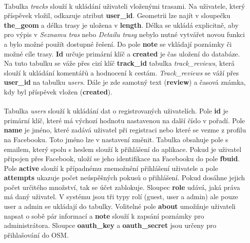 \documentclass[11pt,a4paper,titlepage,oneside]{book}
\begin{document}

			\paragraph{} Tabulka \textit{tracks} slouží k ukládání uživateli vloženými trasami. Na uživatele, který příspěvek vložil, odkazuje atribut \textbf{user\_id}. Geometrii lze najít v sloupečku \textbf{the\_geom} a délka trasy je uložena v \textbf{length}. Délka se ukládá explicitně, aby pro výpis v \textit{Seznamu tras} nebo \textit{Detailu trasy} nebylo nutné vytvářet novou funkci a bylo možné použít dostupné řešení.  Do pole \textbf{note} se vkládají poznámky či možné cíle trasy. \textbf{Id} určuje primární klíč a \textbf{created} je čas uložení do databáze. Na tuto tabulku se váže přes cizí klíč \textbf{track\_id} tabulka \textit{track\_reviews}, která slouží k ukládání komentářů a hodnocení k cestám. \textit{Track\_reviews} se váží přes \textbf{user\_id} na tabulku \textit{users}. Dále je zde samotný text (\textbf{review}) a časová známka, kdy byl příspěvek vložen (\textbf{created}).
			\paragraph{}\label{par:users}Tabulka \textit{users} slouží k ukládání dat o registrovaných uživatelích. Pole \textbf{id} je primární klíč, které má výchozí hodnotu nastavenou na další číslo v pořadí. Pole \textbf{name} je jméno, které zadává uživatel při registraci nebo které se vezme z profilu na Facebooku. Toto jméno lze v nastavení změnit. Tabulka obsahuje pole s emailem, který spolu s heslem slouží k přihlášení do aplikace. Pokud je uživatel připojen přes Facebook, uloží se jeho identifikace na Facebooku do pole \textbf{fbuid}. Pole \textbf{active} slouží k případnému znemožnění přihlášení uživatele a pole \textbf{attempts} ukazuje počet neúspěšných pokusů o přihlášení. Pokud dosáhne jejich počet určitého množství, tak se účet zablokuje. Sloupec \textbf{role} udává, jaká práva má daný uživatel. V systému jsou tři typy rolí (guest, user a admin) ale pouze user a admin se ukládají do tabulky. Volitelné pole \textbf{about} umožňuje uživateli napsat o sobě pár informací a \textbf{note} slouží k zapsání poznámky pro administrátora. Sloupce \textbf{oauth\_key} a \textbf{oauth\_secret} jsou určeny pro přihlašování do \acl{OSM}.
\end{document}
